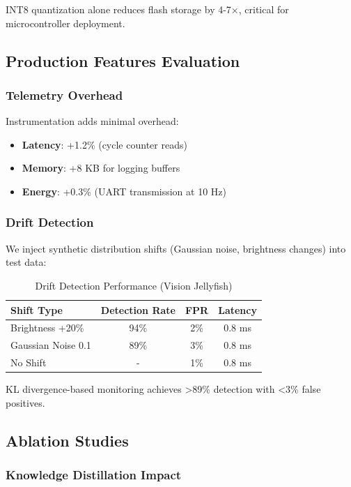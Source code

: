 INT8 quantization alone reduces flash storage by 4-7$\times$, critical for microcontroller deployment.

\subsection{Production Features Evaluation}

\subsubsection{Telemetry Overhead}

Instrumentation adds minimal overhead:
\begin{itemize}
\item \textbf{Latency}: +1.2\% (cycle counter reads)
\item \textbf{Memory}: +8 KB for logging buffers
\item \textbf{Energy}: +0.3\% (UART transmission at 10 Hz)
\end{itemize}

\subsubsection{Drift Detection}

We inject synthetic distribution shifts (Gaussian noise, brightness changes) into test data:

\begin{table}[h]
\centering
\caption{Drift Detection Performance (Vision Jellyfish)}
\label{tab:drift}
\begin{tabular}{lccc}
\hline
\textbf{Shift Type} & \textbf{Detection Rate} & \textbf{FPR} & \textbf{Latency} \\
\hline
Brightness +20\% & 94\% & 2\% & 0.8 ms \\
Gaussian Noise 0.1 & 89\% & 3\% & 0.8 ms \\
No Shift & - & 1\% & 0.8 ms \\
\hline
\end{tabular}
\end{table}

KL divergence-based monitoring achieves >89\% detection with <3\% false positives.

\subsection{Ablation Studies}

\subsubsection{Knowledge Distillation Impact}

